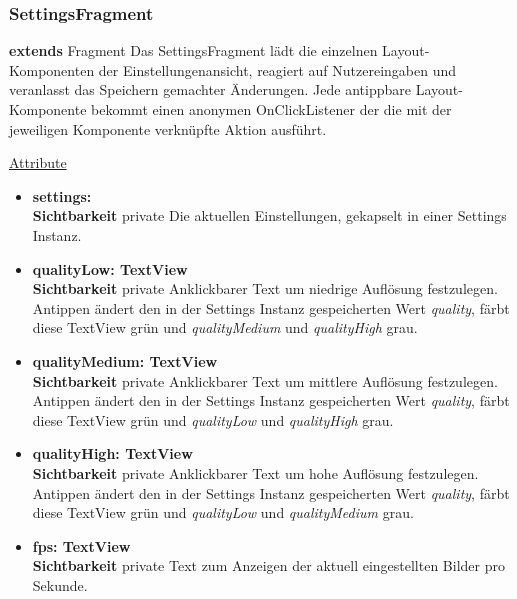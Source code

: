 \subsubsection{SettingsFragment} \label{app:klasse:SettingsFragment}
\textbf{extends} Fragment \newline
Das SettingsFragment lädt die einzelnen Layout-Komponenten der Einstellungenansicht, reagiert auf Nutzereingaben und veranlasst das Speichern gemachter Änderungen. Jede antippbare Layout-Komponente bekommt einen anonymen OnClickListener der die mit der jeweiligen Komponente verknüpfte Aktion ausführt.
\newline

\underline{Attribute}
\begin{itemize}
\itemsep0pt
\item \textbf{settings:  } \hfill\\ 
\textbf{Sichtbarkeit} private \newline
Die aktuellen Einstellungen, gekapselt in einer Settings Instanz.

\item \textbf{qualityLow: TextView} \hfill\\ 
\textbf{Sichtbarkeit} private \newline
Anklickbarer Text um niedrige Auflösung festzulegen. Antippen ändert den in der Settings Instanz gespeicherten Wert \textit{quality}, färbt diese TextView grün und \textit{qualityMedium} und \textit{qualityHigh} grau.

\item \textbf{qualityMedium: TextView} \hfill\\ 
\textbf{Sichtbarkeit} private \newline
Anklickbarer Text um mittlere Auflösung festzulegen. Antippen ändert den in der Settings Instanz gespeicherten Wert \textit{quality}, färbt diese TextView grün und \textit{qualityLow} und \textit{qualityHigh} grau.

\item \textbf{qualityHigh: TextView} \hfill\\ 
\textbf{Sichtbarkeit} private \newline
Anklickbarer Text um hohe Auflösung festzulegen. Antippen ändert den in der Settings Instanz gespeicherten Wert \textit{quality}, färbt diese TextView grün und \textit{qualityLow} und \textit{qualityMedium} grau.

\item \textbf{fps: TextView} \hfill\\ 
\textbf{Sichtbarkeit} private \newline
Text zum Anzeigen der aktuell eingestellten Bilder pro Sekunde.


\end{itemize}
